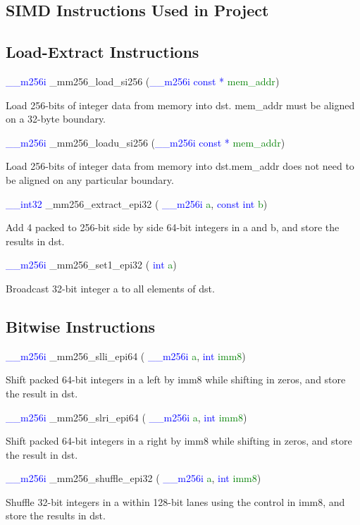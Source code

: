 \documentclass[11pt,oneside,a4paper]{article}
\begin{document}


\begin{appendices}
\section{SIMD Instructions Used in Project}
\subsection{Load-Extract Instructions}
\textcolor{blue}{\_\_m256i} \_mm256\_load\_si256 (\textcolor{blue}{\_\_m256i const *} \textcolor{green}{mem\_addr})
\par Load 256-bits of integer data from memory into dst. mem\_addr must be aligned on a 32-byte boundary.
\par
\textcolor{blue}{\_\_m256i} \_mm256\_loadu\_si256 (\textcolor{blue}{\_\_m256i const *} \textcolor{green}{mem\_addr})
\par Load 256-bits of integer data from memory into dst.mem\_addr does not need to be aligned on any particular boundary.
\par
\textcolor{blue}{ \_\_int32} \_mm256\_extract\_epi32 ( \textcolor{blue}{ \_\_m256i} \textcolor{green}{a}, \textcolor{blue}{const int} \textcolor{green}{b})
\par Add 4 packed to 256-bit side by side 64-bit integers in a and b, and store the results in dst.
\par
\textcolor{blue}{ \_\_m256i} \_mm256\_set1\_epi32 ( \textcolor{blue}{ int} \textcolor{green}{a})
\par Broadcast 32-bit integer a to all elements of dst.
\par 
\subsection{Bitwise Instructions}
\textcolor{blue}{ \_\_m256i} \_mm256\_slli\_epi64 ( \textcolor{blue}{ \_\_m256i} \textcolor{green}{a}, \textcolor{blue}{int} \textcolor{green}{imm8})
\par Shift packed 64-bit integers in a left by imm8 while shifting in zeros, and store the result in dst.
\par
\textcolor{blue}{ \_\_m256i} \_mm256\_slri\_epi64 ( \textcolor{blue}{ \_\_m256i} \textcolor{green}{a}, \textcolor{blue}{int} \textcolor{green}{imm8})
\par Shift packed 64-bit integers in a right by imm8 while shifting in zeros, and store the result in dst.
\par
\textcolor{blue}{ \_\_m256i} \_mm256\_shuffle\_epi32 ( \textcolor{blue}{ \_\_m256i} \textcolor{green}{a}, \textcolor{blue}{int} \textcolor{green}{imm8})
\par Shuffle 32-bit integers in a within 128-bit lanes using the control in imm8, and store the results in dst.

\end{appendices}
\end{document}
